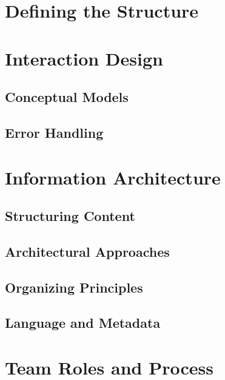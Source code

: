 \section{Defining the Structure}
\section{Interaction Design}
\subsection{Conceptual Models}
\subsection{Error Handling}
\section{Information Architecture}
\subsection{Structuring Content}
\subsection{Architectural Approaches}
\subsection{Organizing Principles}
\subsection{Language and Metadata}
\section{Team Roles and Process}